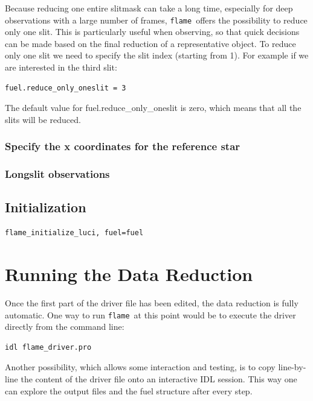 \documentclass[a4paper, notitlepage]{article}
\newcommand{\flame}{\texttt{flame}}
\begin{document}
Because reducing one entire slitmask can take a long time, especially for deep observations with a large number of frames, \flame\ offers the possibility to reduce only one slit. This is particularly useful when observing, so that quick decisions can be made based on the final reduction of a representative object. To reduce only one slit we need to specify the slit index (starting from 1). For example if we are interested in the third slit:
\begin{lstlisting}
fuel.reduce_only_oneslit = 3
\end{lstlisting}
The default value for fuel.reduce\_only\_oneslit is zero, which means that all the slits will be reduced.

\subsubsection{Specify the x coordinates for the reference star}

\subsubsection{Longslit observations}



\subsection{Initialization}

\begin{lstlisting}
flame_initialize_luci, fuel=fuel
\end{lstlisting}








\section{Running the Data Reduction}

Once the first part of the driver file has been edited, the data reduction is fully automatic. One way to run \flame\ at this point would be to execute the driver directly from the command line:
\begin{lstlisting}
idl flame_driver.pro
\end{lstlisting}
Another possibility, which allows some interaction and testing, is to copy line-by-line the content of the driver file onto an interactive IDL session. This way one can explore the output files and the fuel structure after every step.
\end{document}
